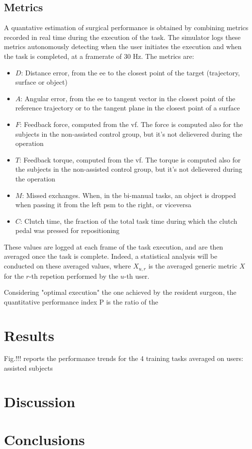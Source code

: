 \documentclass{article}
\begin{document}
\begin{multicols}{2}
\subsection{Metrics}
A quantative estimation of surgical performance is obtained by combining metrics recorded in real time during the execution of the task. The simulator logs these metrics autonomously detecting when the user initiates the execution and when the task is completed, at a framerate of 30 Hz. The metrics are:
\begin{itemize}
  \item $D$: Distance error, from the \ac{ee} to the closest point of the target (trajectory, surface or object)
  \item $A$: Angular error, from the \ac{ee} to tangent vector in the closest point of the reference trajectory or to the tangent plane in the closest point of a surface
  \item $F$: Feedback force, computed from the \ac{vf}. The force is computed also for the subjects in the non-assisted control group, but it's not delievered during the operation
  \item $T$: Feedback torque, computed from the \ac{vf}. The torque is computed also for the subjects in the non-assisted control group, but it's not delievered during the operation
  \item $M$: Missed exchanges. When, in the bi-manual tasks, an object is dropped when passing it from the left \ac{psm} to the right, or viceversa
  \item $C$: Clutch time, the fraction of the total task time during which the clutch pedal was pressed for repositioning
\end{itemize} 
These values are logged at each frame of the task execution, and are then averaged once the task is complete. Indeed, a statistical analysis will be conducted on these averaged values, where $X_{u,r}$ is the averaged generic metric $X$ for the $r$-th repetion performed by the $u$-th user.

Considering "optimal execution" the one achieved by the resident surgeon, the quantitative performance index P is the ratio of the 

\section{Results}
Fig.!!! reports the performance trends for the 4 training tasks averaged on users: assisted subjects  
\section{Discussion}
\section{Conclusions}


\end{multicols}
\end{document}
